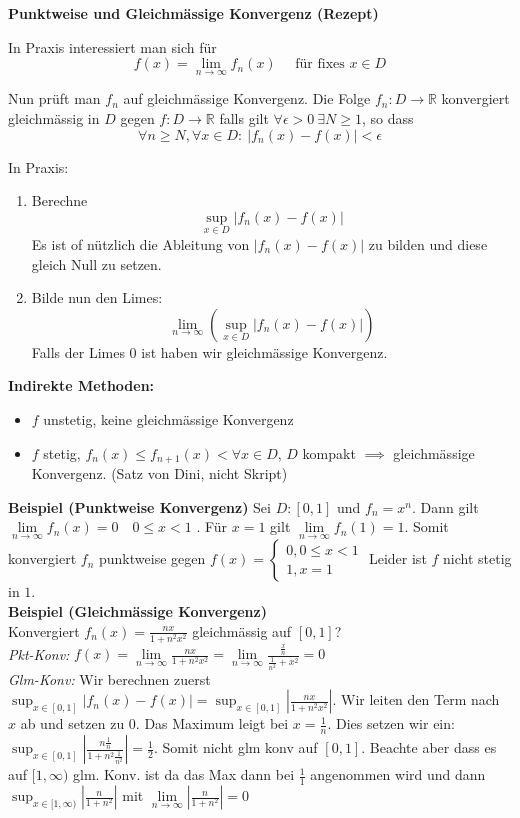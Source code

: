 \documentclass[25pt]{sciposter}
\newcommand{\limm}{\lim\limits_{n \to \infty}}
\newcommand{\R}{\mathbb{R}}
\newenvironment{method}[1]{\begin{mdframed}[backgroundcolor=blue!10,innertopmargin=15pt, innerbottommargin=15pt, nobreak=true]
		\textbf{#1 }
	}
	{ 
	\end{mdframed}
}
\begin{document}
\begin{multicols}{3}
\begin{method}{Punktweise und Gleichmässige Konvergenz (Rezept)}
In Praxis interessiert man sich für 
$$f(x) = \limm f_n(x) \quad \text{ für fixes $x \in D$}$$

Nun prüft man $f_n$ auf gleichmässige Konvergenz. 	Die Folge $f_n : D \to \R$ konvergiert gleichmässig in $D$ gegen $f:D \to \R$ falls gilt $ \forall \epsilon > 0 \ \exists N \geq 1$, so dass 
$$ \forall n \geq N , \forall x \in D : \ |f_n(x) - f(x)| < \epsilon$$

In Praxis:
\begin{enumerate}
	\item Berechne $$\sup_{x\in D} |f_n(x) -f(x)|$$ Es ist of nützlich die Ableitung von $|f_n(x) -f(x)|$ zu bilden und diese gleich Null zu setzen.
	\item Bilde nun den Limes: $$\limm \left(\sup_{x\in D} |f_n(x) -f(x)|\right)$$ Falls der Limes 0 ist haben wir gleichmässige Konvergenz.
\end{enumerate}
\textbf{Indirekte Methoden:}
\begin{itemize}
	\item $f$ unstetig, keine gleichmässige Konvergenz
	\item $f$ stetig, $f_n (x)\leq f_{n+1}(x) < \forall x \in D$, $D$ kompakt $\implies$ gleichmässige Konvergenz. (Satz von Dini, nicht Skript)
\end{itemize}
\end{method}


\textbf{Beispiel (Punktweise Konvergenz)}
Sei $D:[0,1]$ und $f_n = x^n$. Dann gilt $\limm f_n(x) = 0 \quad 0 \leq x < 1$
. Für $x=1$ gilt $ \limm f_n(1) = 1$. Somit konvergiert $f_n$ punktweise gegen 
$
f(x)=
\begin{cases}
0 , 0 \leq x < 1\\
1 , x=1
\end{cases}
$ Leider ist $f$ nicht stetig in $1$.\\

\textbf{Beispiel (Gleichmässige Konvergenz)}\\
Konvergiert $f_n(x) = \frac{nx}{1+n^2 x^2}$ gleichmässig auf $\left[0,1 \right]$?\\
\textit{Pkt-Konv:} $f(x) = \limm \frac{nx}{1+n^2 x^2} = \limm \frac{\frac{x}{n}}{\frac{1}{n^2}+x^2} = 0$\\
\textit{Glm-Konv:} Wir berechnen zuerst $\sup _{x\in [0,1]} | f_n(x) -f(x) | = \sup _{x\in [0,1]} |\frac{nx}{1+n^2 x^2}|$. Wir leiten den Term nach $x$ ab und setzen zu 0. Das Maximum leigt bei $x = \frac{1}{n}$. Dies setzen wir ein:
$\sup _{x\in [0,1]} \left|\frac{n\frac{1}{n}}{1+n^2 \frac{1}{n^2}}\right| = \frac{1}{2}$. Somit nicht glm konv auf $[0,1]$. Beachte aber dass es auf $[1,\infty)$ glm. Konv. ist da das Max dann bei $\frac{1}{1}$ angenommen wird und dann $\sup _{x\in [1,\infty)} \left|\frac{n}{1+n^2}\right|$ mit $\limm \left|\frac{n}{1+n^2}\right| = 0$




\end{multicols}
\end{document}
